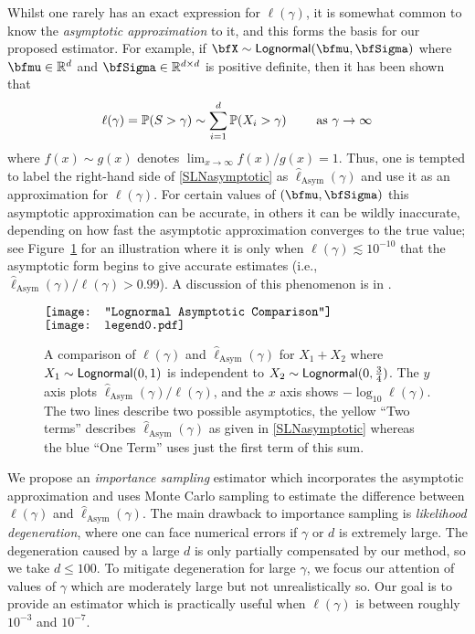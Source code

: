 Whilst one rarely has an exact expression for $\ell(\gamma)$, it is somewhat common to know the \emph{asymptotic approximation} to it, and this forms the basis for our proposed estimator. For example, if $\bfX \sim \mathsf{Lognormal}(\bfmu, \bfSigma)$ where $\bfmu \in \RL^d$ and $\bfSigma \in \RL^{d \times d}$ is positive definite, then it has been shown that \cite{asmussen2008asymptotics}
\begin{equation} \label{SLNasymptotic}
\ell(\gamma) = \operatorname{{\mathbb P}}(S > \gamma) \sim \sum_{i=1}^d \operatorname{{\mathbb P}}(X_i > \gamma) \qquad \text{ as } \gamma \to \infty
\end{equation}
where $f(x) \sim g(x)$ denotes $\lim_{x \to \infty} f(x)/g(x) = 1$. Thus, one is tempted to label the right-hand side of \eqref{SLNasymptotic} as $\hat{\ell}_{\mathrm{Asym}}(\gamma)$ and use it as an approximation for $\ell(\gamma)$. For certain values of $(\bfmu,\bfSigma)$ this asymptotic approximation can be accurate, in others it can be wildly inaccurate, depending on how fast the asymptotic approximation converges to the true value; see Figure~\ref{fig:slow_convergence} for an illustration where it is only when $\ell(\gamma) \lesssim 10^{-10}$ that the asymptotic form begins to give accurate estimates (i.e., $\hat{\ell}_{\mathrm{Asym}}(\gamma) / \ell(\gamma) > 0.99$). A discussion of this phenomenon is in \cite{botev2017fast}.

\begin{figure}
\centering
$\vcenter{\hbox{\texttt{[image: "Lognormal Asymptotic Comparison"]}}}$
 \hspace*{.1in}
 $\vcenter{\hbox{\texttt{[image: legend0.pdf]}}}$
\caption{A comparison of $\ell(\gamma)$ and $\hat{\ell}_{\mathrm{Asym}}(\gamma)$ for $X_1+X_2$ where $X_1 \sim \mathsf{Lognormal}(0, 1)$ is independent to $X_2\sim\mathsf{Lognormal}(0,\frac{3}{4})$. The $y$ axis plots $\hat{\ell}_{\mathrm{Asym}}(\gamma) / \ell(\gamma)$, and the $x$ axis shows ${-}\log_{10} \ell(\gamma)$. The two lines describe two possible asymptotics, the yellow ``Two terms'' describes $\hat{\ell}_{\mathrm{Asym}}(\gamma)$ as given in \eqref{SLNasymptotic} whereas the blue ``One Term'' uses just the first term of this sum.}
\label{fig:slow_convergence}
\end{figure}

We propose an \emph{importance sampling} estimator which incorporates the asymptotic approximation and uses Monte Carlo sampling to estimate the difference between $\ell(\gamma)$ and $\hat{\ell}_{\mathrm{Asym}}(\gamma)$.
The main drawback to importance sampling is \emph{likelihood degeneration}, where one can face numerical errors if $\gamma$ or $d$ is extremely large.
The degeneration caused by a large $d$ is only partially compensated by our method, so we take $d \le 100$.
To mitigate degeneration for large $\gamma$, we focus our attention of values of $\gamma$ which are moderately large but not unrealistically so.
Our goal is to provide an estimator which is practically useful when $\ell(\gamma)$ is between roughly $10^{-3}$ and $10^{-7}$.

